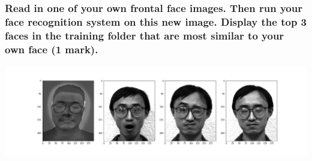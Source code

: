 \documentclass[]{article}
\begin{document}
\subsubsection{Read in one of your own frontal face images. Then run your face recognition system on this new image. Display the top 3 faces in the training folder that are most similar to your own face (1 mark).}
\includegraphics[width=15cm]{mytop3.png}
\end{document}
